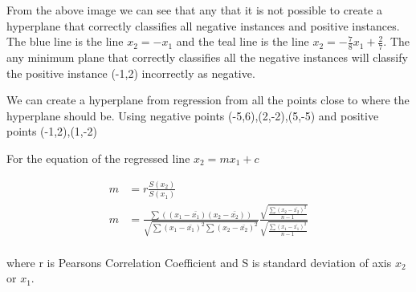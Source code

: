\documentclass[10pt,a4paper]{article}
\begin{document}
\begin{center}
\end{center}

From the above image we can see that any that it is not possible to create a hyperplane that correctly classifies all negative instances and positive instances. The blue line is the line $x_2 = -x_1$ and the teal line is the line $x_2 = -\frac{7}{8}x_1 + \frac{2}{7}$. The any minimum plane that correctly classifies all the negative instances will classify the positive instance (-1,2) incorrectly as negative. 

We can create a hyperplane from regression from all the points close to where the hyperplane should be. Using negative points (-5,6),(2,-2),(5,-5) and positive points (-1,2),(1,-2)

For the equation of the regressed line $x_2=mx_1+c$

\begin{equation}
\begin{split}
\label{m}
m &= r\frac{S(x_2)}{S(x_1)}\\ 
m &= \frac{\sum((x_1 - \bar{x_1})(x_2-\bar{x_2}))}{\sqrt{\sum (x_1-\bar{x_1})^2 \sum(x_2-\bar{x_2})^2}} \frac{\sqrt{\frac{\sum (x_2-\bar{x_2})^2}{n-1}}}{\sqrt{\frac{\sum (x_1-\bar{x_1})^2}{n-1}}}\\
\end{split}
\end{equation}

where r is Pearsons Correlation Coefficient and S is standard deviation of axis $x_2$ or $x_1$.
\end{document}
